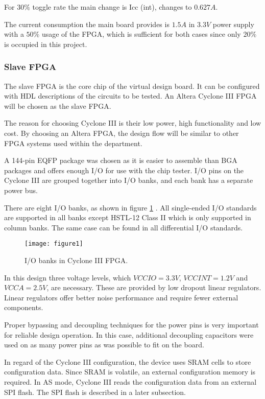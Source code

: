 For $30\%$ toggle rate the main change is Icc (int), changes to $0.627A$.

The current consumption the main board provides is $1.5A$ in $3.3V$ power supply
with a $50\%$ usage of the FPGA, which is sufficient for both cases since only $20\%$
is occupied in this project.


\subsubsection{Slave FPGA}
The slave FPGA is the core chip of the virtual design board. It can be configured
with HDL descriptions of the circuits to be tested.
An Altera Cyclone III FPGA will be chosen as the slave FPGA.

The reason for choosing Cyclone III is their low power, high functionality and low cost. By choosing
an Altera FPGA, the design flow will be similar to other FPGA systems used within the department.

A 144-pin EQFP package was chosen as it is easier to assemble than BGA packages and offers enough I/O
for use with the chip tester. I/O pins on the Cyclone III are grouped together into I/O banks,
and each bank has a separate power bus.

There are eight I/O banks, as shown in figure \ref{fig:b2_f1} \citep{Altera:2011:cyclone3handbook}.
All single-ended I/O standards are supported in all banks except HSTL-12 Class II which is only supported in column banks.
The same case can be found in all differential I/O standards.

\begin{figure}
 \centering
 \texttt{[image: figure1]}
 \caption{I/O banks in Cyclone III FPGA.}
 \label{fig:b2_f1}
\end{figure}

In this design three voltage levels, which $VCCIO=3.3V$, $VCCINT= 1.2V$ and $VCCA=2.5V$, are necessary. These are provided
by low dropout linear regulators. Linear regulators offer better noise performance and require fewer external components.

Proper bypassing and decoupling techniques for the power pins is very important for reliable design operation.
In this case, additional decoupling capacitors were used on as many power pins as was possible to fit on the board.

In regard of the Cyclone III configuration, the device uses SRAM cells to
store configuration data. Since SRAM is volatile, an external configuration memory is required.
In AS mode, Cyclone III reads the configuration data from an external SPI flash. The SPI
flash is described in a later subsection.

